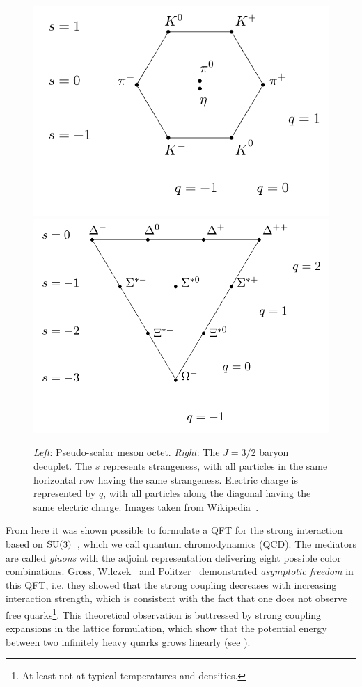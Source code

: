 \begin{figure}[t]
  \centering
  \includegraphics[width=0.48\linewidth]{figs/Meson_octet.png}
  \includegraphics[width=0.48\linewidth]{figs/Baryon_decuplet.png}
  \caption{{\it Left}: Pseudo-scalar meson octet. {\it Right}:
           The $J=3/2$ baryon decuplet. The $s$ represents strangeness,
           with all particles in the same horizontal row having the
           same strangeness. Electric charge is represented by $q$,
           with all particles along the diagonal having the same
           electric charge. Images taken from
           Wikipedia~\cite{wiki_eightfold}.}
  \label{fig:eightfold}
\end{figure}

From here it was shown possible to formulate a QFT for the strong interaction
based on $\operatorname{SU}(3)$~\cite{fritzsch_advantages_1973}, which we
call quantum chromodynamics (QCD). 
The mediators are called
{\it gluons} with the adjoint representation delivering
eight possible color combinations.
Gross, Wilczek~\cite{gross_d.j._ultraviolet_1973} and
Politzer~\cite{politzer_reliable_1973} demonstrated {\it asymptotic freedom}
 in this QFT, i.e. they showed that the
strong coupling decreases with increasing interaction strength, which is
consistent with the fact that one does not observe free quarks\footnote{At
least not at typical temperatures and densities.}.
This theoretical observation is buttressed by strong coupling
expansions in the lattice formulation, which show that the potential
energy between two infinitely heavy quarks grows linearly
(see ).


